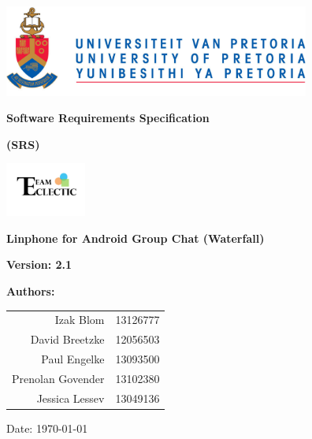 \begin{titlepage}
\begin{flushright}

\includegraphics[width=380px]{../global/University_of_Pretoria_Logo.png}
\newline
\newline

\textbf {\LARGE Software Requirements Specification} \newline

\textbf {\Large (SRS)}\newline

\centering\includegraphics[width=100px]{../global/Logo.jpg}

\textbf {\Large Linphone for Android Group Chat (Waterfall)}\newline

\textbf {\large Version: 2.1}\newline

\centering \textbf {\large Authors:}

\begin{table}[H]
\large
\centering
\begin{tabular}{rl}
	Izak Blom & 13126777 \\
	David Breetzke & 12056503 \\
	Paul Engelke & 13093500 \\
	Prenolan Govender & 13102380 \\
	Jessica Lessev & 13049136 \\
\end{tabular}
\end{table}

Date: \today

\end{flushright}
\end{titlepage}